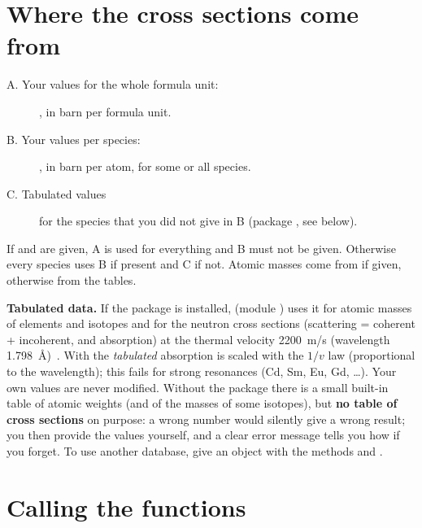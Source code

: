 \section{Where the cross sections come from}

\begin{description}
  \item[A. Your values for the whole formula unit:] , in barn per formula unit.
  \item[B. Your values per species:] , in barn per atom, for some or all species.
  \item[C. Tabulated values] for the species that you did not give in B (package , see below).
\end{description}
If  and  are given, A is used for everything and B must not be given. Otherwise every species uses B if present and C if not.
Atomic masses come from  if given, otherwise from the tables.

{\sloppy\textbf{Tabulated data.} If the package  is installed,  (module ) uses it for atomic masses of
elements and isotopes and for the neutron cross sections (scattering = coherent + incoherent, and absorption) at the thermal velocity 2200~m/s
(wavelength 1.798~\AA)~\cite{sears,periodictable}. With  the \emph{tabulated} absorption is scaled with the $1/v$ law (proportional to the
wavelength); this fails for strong resonances (Cd, Sm, Eu, Gd, \ldots). Your own values are never modified.
Without the package there is a small built-in table of atomic weights (and of the masses of some isotopes), but \textbf{no table of cross sections} on purpose:
a wrong number would silently give a wrong result; you then provide the values yourself, and a clear error message tells you how if you forget.
To use another database, give  an object with the methods  and .\par}

\section{Calling the functions}

